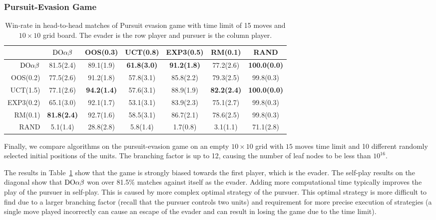 \subsubsection{Pursuit-Evasion Game}

\begin{table}
\centering
\begin{scriptsize}

\begin{tabular}{|r|cccccc|}\hline
&$\textrm{DO}\alpha\beta$&OOS(0.3)&UCT(0.8)&EXP3(0.5)&RM(0.1)&RAND\\\hline
$\textrm{DO}\alpha\beta$&81.5(2.4)&89.1(1.9)&\textbf{61.8(3.0)}&\textbf{91.2(1.8)}&77.2(2.6)&\textbf{100.0(0.0)}\\
OOS(0.2)&77.5(2.6)&91.2(1.8)&57.8(3.1)&85.8(2.2)&79.3(2.5)&99.8(0.3)\\
UCT(1.5)&77.1(2.6)&\textbf{94.2(1.4)}&57.6(3.1)&88.9(1.9)&\textbf{82.2(2.4)}&\textbf{100.0(0.0)}\\
EXP3(0.2)&65.1(3.0)&92.1(1.7)&53.1(3.1)&83.9(2.3)&75.1(2.7)&99.8(0.3)\\
RM(0.1)&\textbf{81.8(2.4)}&92.7(1.6)&58.5(3.1)&86.7(2.1)&78.6(2.5)&99.8(0.3)\\
RAND&5.1(1.4)&28.8(2.8)&5.8(1.4)&1.7(0.8)&3.1(1.1)&71.1(2.8)\\
\hline
\end{tabular}

\end{scriptsize}
\caption{Win-rate in head-to-head matches of Pursuit evasion game with time limit of 15 moves and $10\times 10$ grid board.
The evader is the row player and pursuer is the column player.}\label{fig:matches:peg}
\end{table}


Finally, we compare algorithms on the pursuit-evasion game on an empty $10\times 10$ grid with $15$ moves time limit and 10 different randomly selected initial positions of the units. The branching factor is up to 12, causing the number of leaf nodes to be less than $10^{16}$.

The results in Table~\ref{fig:matches:peg} show that the game is strongly biased towards the first player, which is the evader. The self-play results on the diagonal show that $\textrm{DO}\alpha\beta$ won over 81.5\% matches against itself as the evader. Adding more computational time typically improves the play of the pursuer in self-play. This is caused by more complex optimal strategy of the pursuer. This optimal strategy is more difficult to find due to a larger branching factor (recall that the pursuer controls two units) and requirement for more precise execution of strategies (a single move played incorrectly can cause an escape of the evader and can result in losing the game due to the time limit).

